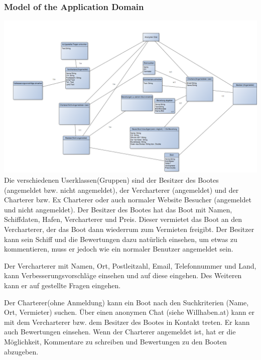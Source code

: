 \documentclass[12pt]{article}
\theoremstyle{definition}
\begin{document}
\subsubsection{Model of the Application Domain}
	\includegraphics[height=0.50\textwidth]{SysUML.PNG}
	Die verschiedenen Userklassen(Gruppen) sind der Besitzer des Bootes (angemeldet bzw. nicht angemeldet), der Vercharterer (angemeldet) und der Charterer bzw. Ex Charterer oder auch normaler Website Besucher (angemeldet und nicht angemeldet).
	Der Besitzer des Bootes hat das Boot mit Namen, Schiffdaten, Hafen, Vercharterer und Preis. Dieser vermietet das Boot an den Vercharterer, der das Boot dann wiederrum zum Vermieten freigibt.  Der Besitzer kann sein Schiff und die Bewertungen dazu natürlich einsehen, um etwas zu kommentieren, muss er jedoch wie ein normaler Benutzer angemeldet sein.

	Der Vercharterer mit Namen, Ort, Postleitzahl, Email, Telefonnummer und Land, kann Verbesserungsvorschläge einsehen und auf diese eingehen. Des Weiteren kann er auf gestellte Fragen eingehen.

	Der Charterer(ohne Anmeldung) kann ein Boot nach den Suchkriterien (Name, Ort, Vermieter) suchen. Über einen anonymen Chat (siehe Willhaben.at) kann er mit dem Vercharterer bzw. dem Besitzer des Bootes in Kontakt treten. Er kann auch Bewertungen einsehen. Wenn der Charterer angemeldet ist, hat er die Möglichkeit, Kommentare zu schreiben und Bewertungen zu den Booten abzugeben. 
\end{document}
